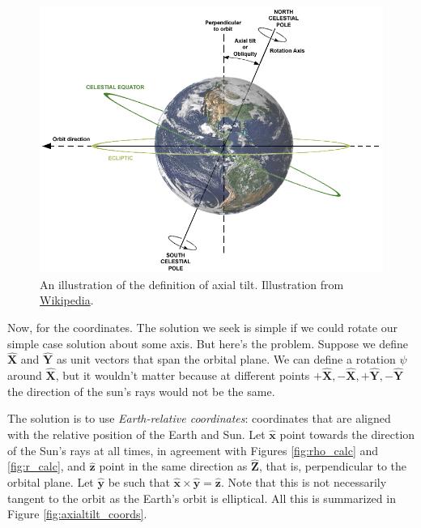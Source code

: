 \documentclass[10pt]{article}
\begin{document}
\begin{figure}[!h]
	\centering
		\includegraphics[width=150mm]{AxialTiltObliquity.png}
	\caption{An illustration of the definition of axial tilt. Illustration from \href{http://en.wikipedia.org/wiki/File:AxialTiltObliquity.png}{Wikipedia}.}
	\label{fig:axialtilt}
\end{figure}

\vspace{10pt}
Now, for the coordinates. The solution we seek is simple if we could rotate our simple case solution about some axis. But here's the problem. Suppose we define $\mathbf{\hat{X}}$ and $\mathbf{\hat{Y}}$ as unit vectors that span the orbital plane. We can define a rotation $\psi$ around $\mathbf{\hat{X}}$, but it wouldn't matter because at different points $+\mathbf{\hat{X}}, -\mathbf{\hat{X}}, +\mathbf{\hat{Y}}, -\mathbf{\hat{Y}}$ the direction of the sun's rays would not be the same.

\vspace{10pt}
The solution is to use \emph{Earth-relative coordinates}: coordinates that are aligned with the relative position of the Earth and Sun. Let $\mathbf{\hat{x}}$ point towards the direction of the Sun's rays at all times, in agreement with Figures \ref{fig:rho_calc} and \ref{fig:r_calc}, and $\mathbf{\hat{z}}$ point in the same direction as $\mathbf{\hat{Z}}$, that is, perpendicular to the orbital plane. Let $\mathbf{\hat{y}}$ be such that $\mathbf{\hat{x}} \times \mathbf{\hat{y}} = \mathbf{\hat{z}}$. Note that this is not necessarily tangent to the orbit as the Earth's orbit is elliptical. All this is summarized in Figure \ref{fig:axialtilt_coords}.
\end{document}
